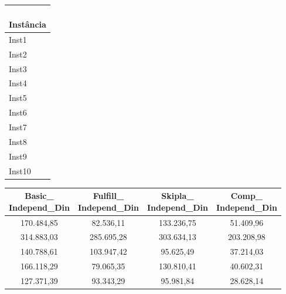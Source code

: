 \begin{table}[H]
	\centering
	\setlength{\tabcolsep}{4pt}
	\scriptsize
	\begin{subtable}[t]{0.10\textwidth}
		\centering
		\begin{tabular}{@{}l@{}}
			\toprule
			\makecell[l]{\textbf{ } \\\textbf{Instância}}  \\
			\midrule
			Inst1                   \\
			Inst2                   \\
			Inst3                   \\
			Inst4                   \\
			Inst5                   \\
			Inst6                   \\
			Inst7                   \\
			Inst8                   \\
			Inst9                   \\
			Inst10                  \\
			\bottomrule
		\end{tabular}
	\end{subtable}
	\hfill
	\begin{subtable}[t]{0.44\textwidth}
		\centering
		\begin{tabular}{@{}cccc@{}}
			\toprule
			\makecell[c]{\textbf{Basic\_}                                          \\\textbf{Independ\_Din}}
			           & \makecell[c]{\textbf{Fulfill\_}                           \\\textbf{Independ\_Din}}
			           & \makecell[c]{\textbf{Skipla\_}                            \\\textbf{Independ\_Din}}
			           & \makecell[c]{\textbf{Comp\_}                              \\\textbf{Independ\_Din}} \\
			\midrule
			170.484,85 & 82.536,11                       & 133.236,75 & 51.409,96  \\
			314.883,03 & 285.695,28                      & 303.634,13 & 203.208,98 \\
			140.788,61 & 103.947,42                      & 95.625,49  & 37.214,03  \\
			166.118,29 & 79.065,35                       & 130.810,41 & 40.602,31  \\
			127.371,39 & 93.343,29                       & 95.981,84  & 28.628,14  \\

\end{tabular}
\end{subtable}
\end{table}
